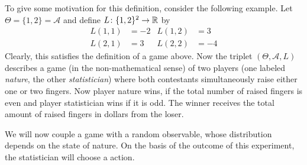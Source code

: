 To give some motivation for this definition, consider the following example. Let $\Theta=\{1,2\}=\mathcal{A}$ and define $L\colon \{1,2\}^2\to \mathbb{R}$ by
\begin{align*}
	L(1,1)&=-2&L(1,2)&=3\\
	L(2,1)&=3&L(2,2)&=-4
\end{align*}
Clearly, this satisfies the definition of a game above. Now the triplet $(\Theta,\mathcal{A},L)$ describes a game (in the non-mathematical sense) of two players (one labeled \emph{nature}, the other \emph{statistician}) where both contestants simultaneously raise either one or two fingers. Now player \glqq nature\grqq{} wins, if the total number of raised fingers is even and player \glqq statistician\grqq{} wins if it is odd. The winner receives the total amount of raised fingers in dollars from the loser.


We will now couple a game with a random observable, whose distribution depends on the state of nature. On the basis of the outcome of this experiment, the statistician will choose a action.

